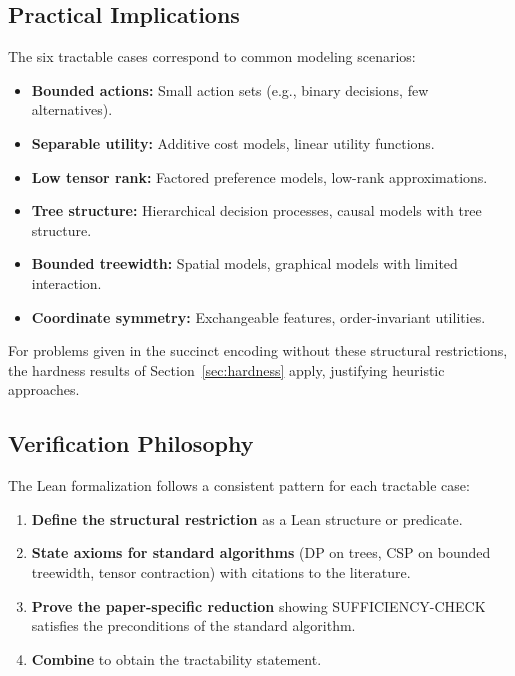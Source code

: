\subsection{Practical Implications}\label{sec:tract-practical}

The six tractable cases correspond to common modeling scenarios:

\begin{itemize}
\item \textbf{Bounded actions:} Small action sets (e.g., binary decisions, few alternatives).
\item \textbf{Separable utility:} Additive cost models, linear utility functions.
\item \textbf{Low tensor rank:} Factored preference models, low-rank approximations.
\item \textbf{Tree structure:} Hierarchical decision processes, causal models with tree structure.
\item \textbf{Bounded treewidth:} Spatial models, graphical models with limited interaction.
\item \textbf{Coordinate symmetry:} Exchangeable features, order-invariant utilities.
\end{itemize}

For problems given in the succinct encoding without these structural restrictions, the hardness results of Section~\ref{sec:hardness} apply, justifying heuristic approaches.

\subsection{Verification Philosophy}\label{sec:tract-verification}

The Lean formalization follows a consistent pattern for each tractable case:

\begin{enumerate}
\item \textbf{Define the structural restriction} as a Lean structure or predicate.
\item \textbf{State axioms for standard algorithms} (DP on trees, CSP on bounded treewidth, tensor contraction) with citations to the literature.
\item \textbf{Prove the paper-specific reduction} showing SUFFICIENCY-CHECK satisfies the preconditions of the standard algorithm.
\item \textbf{Combine} to obtain the tractability statement.
\end{enumerate}

